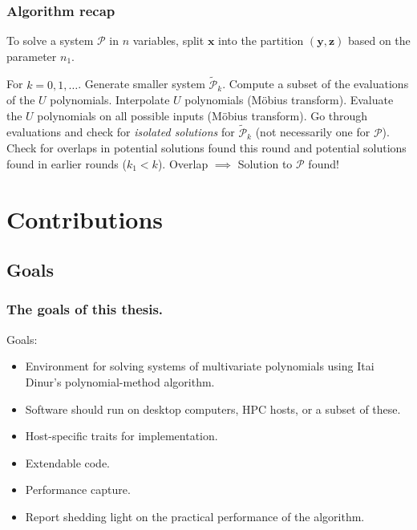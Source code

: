 \documentclass{beamer}
\begin{document}
\begin{frame}
    \frametitle{Algorithm recap}
    To solve a system $\mathcal{P}$ in $n$ variables, split $\mathbf{x}$ into the partition $(\mathbf{y}, \mathbf{z})$ based on the parameter $n_1$.

    \begin{outline}
         For $k = 0, 1, \dots$.
             Generate smaller system $\tilde{\mathcal{P}}_k$.
             Compute a subset of the evaluations of the $U$ polynomials.
             Interpolate $U$ polynomials (Möbius transform).
             Evaluate the $U$ polynomials on all possible inputs (Möbius transform).
             Go through evaluations and check for \textit{isolated solutions} for $\tilde{\mathcal{P}}_k$ (not necessarily one for $\mathcal{P}$).
             Check for overlaps in potential solutions found this round and potential solutions found in earlier rounds ($k_1 < k$).
                 Overlap $\implies$ Solution to $\mathcal{P}$ found!
    \end{outline}
\end{frame}

\section{Contributions}

\subsection{Goals}
\begin{frame}
    \frametitle{The goals of this thesis.}
    Goals:
    \begin{itemize}
        \item Environment for solving systems of multivariate polynomials using Itai Dinur's polynomial-method algorithm.
        \item Software should run on desktop computers, HPC hosts, or a subset of these.
        \item Host-specific traits for implementation.
        \item Extendable code.
        \item Performance capture.
        \item Report shedding light on the practical performance of the algorithm.
    \end{itemize}
\end{frame}
\end{document}
